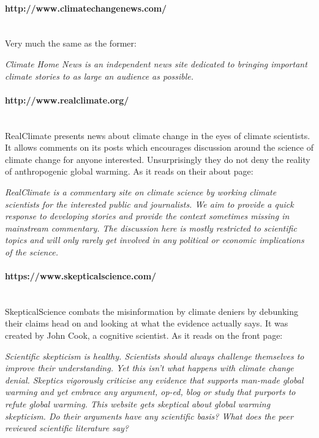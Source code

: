 \documentclass[11pt]{article}
\begin{document}
\paragraph{http://www.climatechangenews.com/} \hspace{0pt} \\
Very much the same as the former:

\begin{displayquote}
\textit{Climate Home News is an independent news site dedicated to bringing important climate
stories to as large an audience as possible.}
\end{displayquote}


\paragraph{http://www.realclimate.org/} \hspace{0pt} \\
RealClimate presents news about climate change in the eyes of climate scientists. It
allows comments on its posts which encourages discussion around the science of
climate change for anyone interested. Unsurprisingly they do not deny the reality of
anthropogenic global warming.  As it reads on their about page:

\begin{displayquote}
\textit{RealClimate is a commentary site on climate science by working climate scientists for
the interested public and journalists. We aim to provide a quick response to developing
stories and provide the context sometimes missing in mainstream commentary. The
discussion here is mostly restricted to scientific topics and will only rarely get
involved in any political or economic implications of the science.}
\end{displayquote}


\paragraph{https://www.skepticalscience.com/} \hspace{0pt} \\
SkepticalScience combats the misinformation by climate deniers by debunking their
claims head on and looking at what the evidence actually says. It was created by
John Cook, a cognitive scientist. As it reads on the front page:

\begin{displayquote}
\textit{Scientific skepticism is healthy. Scientists should always challenge themselves to
improve their understanding. Yet this isn't what happens with climate change denial.
Skeptics vigorously criticise any evidence that supports man-made global warming and
yet embrace any argument, op-ed, blog or study that purports to refute global warming.
This website gets skeptical about global warming skepticism. Do their arguments have
any scientific basis? What does the peer reviewed scientific literature say?}
\end{displayquote}
\end{document}

